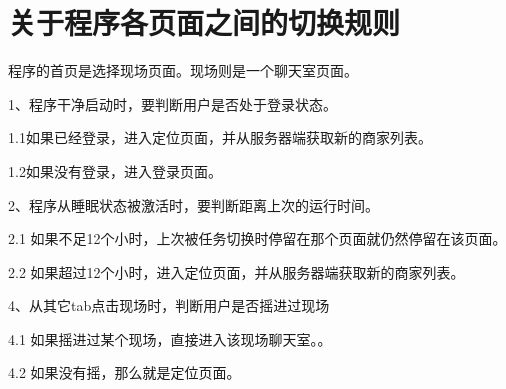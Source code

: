 \documentclass[cs4size]{ctexartutf8}
\begin{document}
\section{关于程序各页面之间的切换规则}

程序的首页是选择现场页面。现场则是一个聊天室页面。

1、程序干净启动时，要判断用户是否处于登录状态。

1.1如果已经登录，进入定位页面，并从服务器端获取新的商家列表。

1.2如果没有登录，进入登录页面。


2、程序从睡眠状态被激活时，要判断距离上次的运行时间。

2.1 如果不足12个小时，上次被任务切换时停留在那个页面就仍然停留在该页面。

2.2 如果超过12个小时，进入定位页面，并从服务器端获取新的商家列表。



4、从其它tab点击现场时，判断用户是否摇进过现场

4.1 如果摇进过某个现场，直接进入该现场聊天室。。

4.2 如果没有摇，那么就是定位页面。




\newpage
\end{document}
